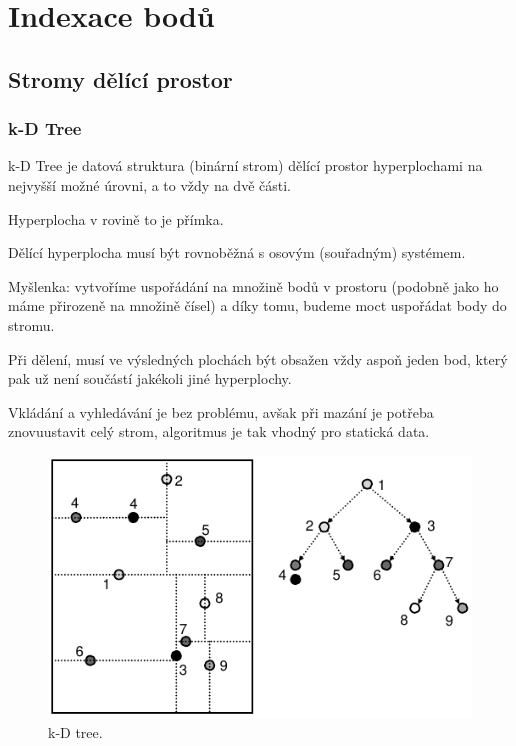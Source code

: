 
\section{Indexace bodů}

\subsection{Stromy dělící prostor}

\subsubsection{k-D Tree}

\begin{compactitem}
    \item k-D Tree je datová struktura (binární strom) dělící prostor hyperplochami na nejvyšší možné úrovni, a to vždy na dvě části. \begin{compactitem}
        \item Hyperplocha v rovině to je přímka.
        \item Dělící hyperplocha musí být rovnoběžná s osovým (souřadným) systémem.
    \end{compactitem}

    \item Myšlenka: vytvoříme uspořádání na množině bodů v prostoru (podobně jako ho máme přirozeně na množině čísel) a díky tomu, budeme moct uspořádat body do stromu.

    \item Při dělení, musí ve výsledných plochách být obsažen vždy aspoň jeden bod, který pak už není součástí jakékoli jiné hyperplochy.

    \item Vkládání a vyhledávání je bez problému, avšak při mazání je potřeba znovuustavit celý strom, algoritmus je tak vhodný pro statická data.
\end{compactitem}

\begin{figure}[H]
    \centering
    \includegraphics[width=0.75\linewidth]{kd_tree.pdf}
    \caption{k-D tree.}
\end{figure}

